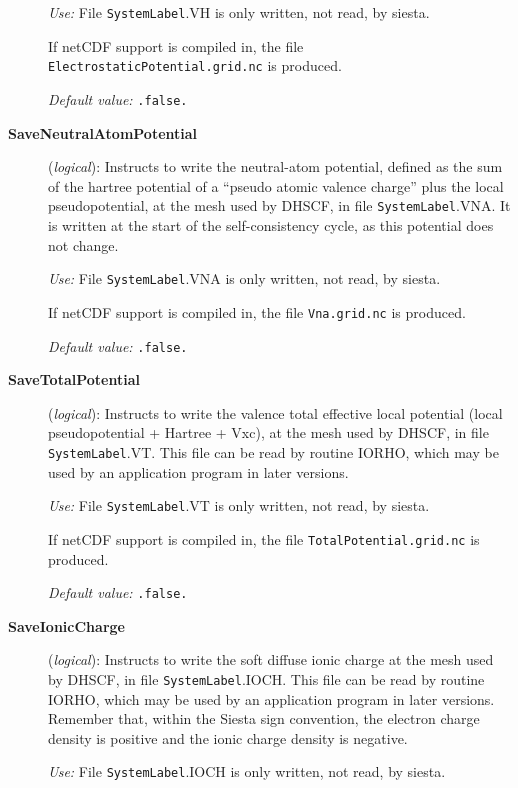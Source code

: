 \documentclass[11pt]{article}
\begin{document}
\begin{description}
{\it Use:} File {\tt SystemLabel}.VH is only written, not read, by siesta.

If netCDF support is compiled in, the file {\tt
ElectrostaticPotential.grid.nc} is produced.

{\it Default value:} {\tt .false.}

\item[{\bf SaveNeutralAtomPotential}] ({\it logical}): 
Instructs to write the neutral-atom potential, defined as the
sum of the hartree potential of a ``pseudo atomic valence charge'' 
plus the local pseudopotential, at the mesh used by DHSCF,
in file {\tt SystemLabel}.VNA. It is written at the start of the
self-consistency cycle, as this potential does not change.

{\it Use:} File {\tt SystemLabel}.VNA is only written, not read, by siesta.

If netCDF support is compiled in, the file {\tt Vna.grid.nc} is produced.

{\it Default value:} {\tt .false.}
        

\item[{\bf SaveTotalPotential}] ({\it logical}): 
Instructs to write the valence total effective local potential
(local pseudopotential + Hartree + Vxc), at the
mesh used by DHSCF,
in file {\tt SystemLabel}.VT. This file can be read by routine IORHO,
which may be used by an application program in later versions.

{\it Use:} File {\tt SystemLabel}.VT is only written, not read, by siesta.

If netCDF support is compiled in, the file {\tt TotalPotential.grid.nc} is produced.

{\it Default value:} {\tt .false.}
        

\item[{\bf SaveIonicCharge}] ({\it logical}): 
Instructs to write the soft diffuse ionic charge at the
mesh used by DHSCF,
in file {\tt SystemLabel}.IOCH. This file can be read by routine IORHO,
which may be used by an application program in later versions.
Remember that, within the {\sc Siesta} sign convention, the electron charge
density is positive and the ionic charge density is negative. 


{\it Use:} File {\tt SystemLabel}.IOCH is only written, not read, by siesta.


\end{description}
\end{document}
